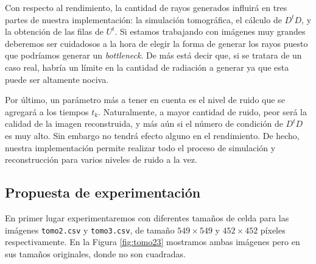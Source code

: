 \documentclass[a4paper]{article}
\begin{document}
Con respecto al rendimiento, la cantidad de rayos generados influirá en tres partes de nuestra implementación: la simulación tomográfica, el cálculo 
de $D^tD$, y la obtención de las filas de $U^t$. Si estamos trabajando con imágenes muy grandes deberemos ser cuidadosos a la hora de elegir la forma 
de generar los rayos puesto que podríamos generar un \textit{bottleneck}. De más está decir que, si se tratara de un caso real, habría un límite en 
la cantidad de radiación a generar ya que esta puede ser altamente nociva.

Por último, un parámetro más a tener en cuenta es el nivel de ruido que se agregará a los tiempos $t_k$. Naturalmente, a mayor cantidad de ruido, peor 
será la calidad de la imagen reconstruida, y más aún si el número de condición de $D^tD$ es muy alto. Sin embargo no tendrá efecto alguno en el 
rendimiento. De hecho, nuestra implementación permite realizar todo el proceso de simulación y reconstrucción para varios niveles de ruido a la vez.

\subsection{Propuesta de experimentación}

En primer lugar experimentaremos con diferentes tamaños de celda para las imágenes \texttt{tomo2.csv} y \texttt{tomo3.csv}, de tamaño 
$549 \times 549$ y $452 \times 452$ píxeles respectivamente. En la Figura \ref{fig:tomo23} mostramos ambas imágenes pero en sus tamaños originales,
donde no son cuadradas.
\end{document}

